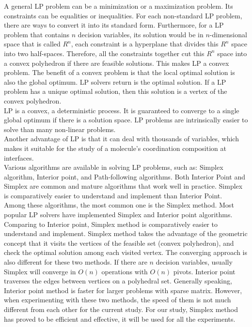 A general LP problem can be a minimization or a maximization problem. Its constraints can be equalities or inequalities. For each non-standard LP problem, there are ways to convert it into its standard form. Furthermore, for a LP problem that contains $n$ decision variables, its solution would be in $n$-dimensional space that is called $R^{n}$, each constraint is a hyperplane that divides this $R^{n}$ space into two half-spaces. Therefore, all the constraints together cut this $R^{n}$ space into a convex polyhedron if there are feasible solutions. This makes LP a convex problem. The benefit of a convex problem is that the local optimal solution is also the global optimum. LP solvers return is the optimal solution. If a LP problem has a unique optimal solution, then this solution is a vertex of the convex polyhedron.\\


LP is a convex, a deterministic process. It is guaranteed to converge to a single global optimum if there is a solution space. LP problems are intrinsically easier to solve than many non-linear problems. \\

Another advantage of LP is that it can deal with thousands of variables, which makes it suitable for the study of a molecule's coordination composition at interfaces. \\

Various algorithms are available in solving LP problems, such as: Simplex algorithm, Interior point, and Path-following algorithms. Both Interior Point and Simplex are common and mature algorithms that work well in practice. Simplex is comparatively easier to understand and implement than Interior Point.\\

Among these algorithms, the most common one is the Simplex method. Most popular LP solvers have implemented Simplex and Interior point algorithms.  Comparing to Interior point, Simplex method is comparatively easier to understand and implement. Simplex method takes the advantage of the geometric concept that it visits the vertices of the feasible set (convex polyhedron), and check the optimal solution among each visited vertex. The converging approach is also different for these two methods. If there are $n$ decision variables, usually Simplex will converge in $O(n)$ operations with $O(n)$ pivots. Interior point traverses the edges between vertices on a polyhedral set. Generally speaking, Interior point method is faster for larger problems with sparse matrix. However, when experimenting with these two methods, the speed of them is not much different from each other for the current study. For our study, Simplex method has proved to be efficient and effective, it will be used for all the experiments.

